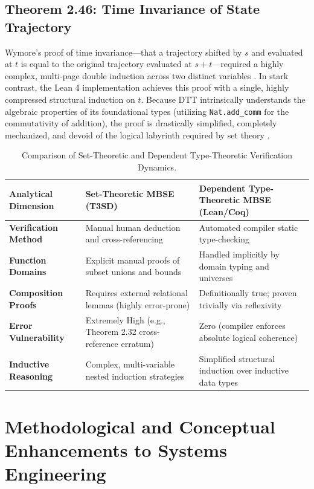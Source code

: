 \documentclass[11pt]{article}
\begin{document}
\subsection{Theorem 2.46: Time Invariance of State Trajectory}
Wymore's proof of time invariance---that a trajectory shifted by $s$ and evaluated at $t$ is equal to the original trajectory evaluated at $s+t$---required a highly complex, multi-page double induction across two distinct variables \parencite{Ref27}. In stark contrast, the Lean 4 implementation achieves this proof with a single, highly compressed structural induction on $t$. Because DTT intrinsically understands the algebraic properties of its foundational types (utilizing \texttt{Nat.add\_comm} for the commutativity of addition), the proof is drastically simplified, completely mechanized, and devoid of the logical labyrinth required by set theory \parencite{Ref27}.\begin{table}[h]
\centering
\renewcommand{\arraystretch}{1.3}
\begin{tabularx}{\textwidth}{@{}l X X@{}}
\toprule
\textbf{Analytical Dimension} & \textbf{Set-Theoretic MBSE (T3SD)} & \textbf{Dependent Type-Theoretic MBSE (Lean/Coq)} \\
\midrule
\textbf{Verification Method} & Manual human deduction and cross-referencing & Automated compiler static type-checking \\
\textbf{Function Domains} & Explicit manual proofs of subset unions and bounds & Handled implicitly by domain typing and universes \\
\textbf{Composition Proofs} & Requires external relational lemmas (highly error-prone) & Definitionally true; proven trivially via reflexivity \\
\textbf{Error Vulnerability} & Extremely High (e.g., Theorem 2.32 cross-reference erratum) & Zero (compiler enforces absolute logical coherence) \\
\textbf{Inductive Reasoning} & Complex, multi-variable nested induction strategies & Simplified structural induction over inductive data types \\
\bottomrule
\end{tabularx}
\caption{Comparison of Set-Theoretic and Dependent Type-Theoretic Verification Dynamics.}
\end{table}

\section{Methodological and Conceptual Enhancements to Systems Engineering}
\end{document}
